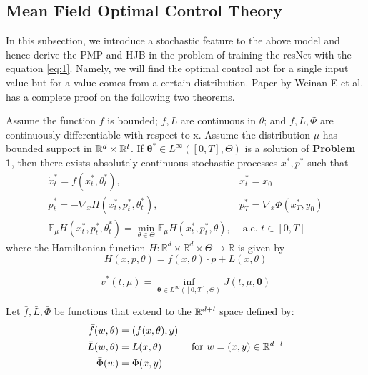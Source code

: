 \subsection{Mean Field Optimal Control Theory}
In this subsection, we introduce a stochastic feature to the above model and hence derive the PMP and HJB in the problem of training the resNet with the equation \eqref{eq:1}. Namely, we will find the optimal control not for a single input value but for a value comes from a certain distribution. Paper by Weinan E et al. \cite{weinan2018mean} has a complete proof on the following two theorems.
\begin{theorem}
Assume the function $f$ is bounded; $f, L$ are continuous in $\theta$; and $f, L, \Phi$ are continuously differentiable with respect to x. Assume the distribution $\mu$ has bounded support in $\mathbb{R}^d \times \mathbb{R}^l$. If $\boldsymbol{\theta}^{*} \in L^{\infty}([0, T], \Theta)$ is a solution of \textbf{Problem 1}, then there exists absolutely continuous stochastic processes $x^*, p^*$ such that
$$
\begin{array}{ll}
\dot{x}_{t}^{*}=f\left(x_{t}^{*}, \theta_{t}^{*}\right), & x_{t}^{*}=x_{0} \\
\dot{p}_{t}^{*}=-\nabla_{x} H\left(x_{t}^{*}, p_{t}^{*}, \theta_{t}^{*}\right), & p_{T}^{*}=\nabla_{x} \Phi\left(x_{T}^{*}, y_{0}\right) \\
\mathbb{E}_{\mu} H\left(x_{t}^{*}, p_{t}^{*}, \theta_{t}^{*}\right)=\min _{\theta \in \Theta} \mathbb{E}_{\mu} H\left(x_{t}^{*}, p_{t}^{*}, \theta\right), & \text { a.e. } t \in[0, T]
\end{array}
$$
where the Hamiltonian function $H: \mathbb{R}^{d} \times \mathbb{R}^{d} \times \Theta \rightarrow \mathbb{R}$ is given by $$H(x, p, \theta)= f(x, \theta) \cdot p +L(x, \theta)$$
\end{theorem}

\begin{definition}
$$v^{*}(t, \mu)=\inf _{\boldsymbol{\theta} \in L^{\infty}([0, T], \Theta)} J(t, \mu, \boldsymbol{\theta})$$
\end{definition}
\begin{definition}
Let $\bar{f},\bar{L},\bar{\Phi} $ be functions that extend to the $\mathbb{R}^{d+l}$ space defined by: $$\begin{aligned}
    \bar{f}(w, \theta) &= (f(x,\theta),y)   \\
    \bar{L}(w, \theta) &= L(x,\theta) \\
    \bar{\Phi}(w) &= \Phi(x,y) \\
\end{aligned}
\quad \text{ for }  w = (x,y) \in \mathbb{R}^{d+l}$$
\end{definition}

